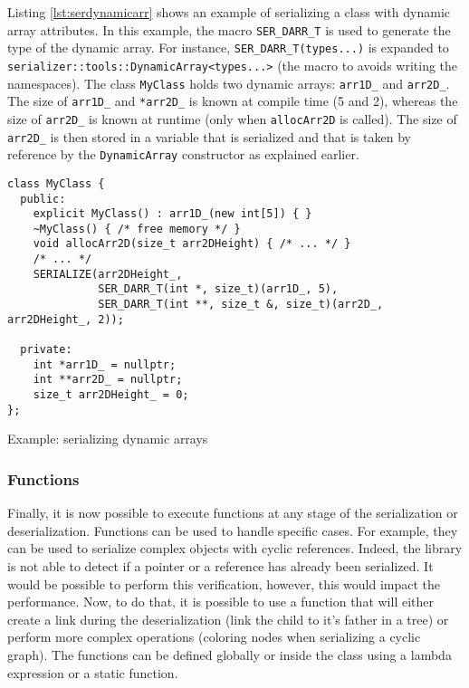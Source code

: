 Listing \ref{lst:serdynamicarr} shows an example of serializing a class with
dynamic array attributes. In this example, the macro \texttt{SER\_DARR\_T} is
used to generate the type of the dynamic array. For instance,
\texttt{SER\_DARR\_T(types...)} is expanded to
\texttt{serializer::tools::DynamicArray<types...>} (the macro to avoids writing
the namespaces). The class \texttt{MyClass} holds two dynamic arrays:
\texttt{arr1D\_} and \texttt{arr2D\_}. The size of \texttt{arr1D\_} and
\texttt{*arr2D\_} is known at compile time (5 and 2), whereas the size of
\texttt{arr2D\_} is known at runtime (only when \texttt{allocArr2D} is called).
The size of \texttt{arr2D\_} is then stored in a variable that is serialized and
that is taken by reference by the \texttt{DynamicArray} constructor as explained
earlier.

\begin{listing}[ht!]
\begin{verbatim}
class MyClass {
  public:
    explicit MyClass() : arr1D_(new int[5]) { }
    ~MyClass() { /* free memory */ }
    void allocArr2D(size_t arr2DHeight) { /* ... */ }
    /* ... */
    SERIALIZE(arr2DHeight_,
              SER_DARR_T(int *, size_t)(arr1D_, 5),
              SER_DARR_T(int **, size_t &, size_t)(arr2D_, arr2DHeight_, 2));

  private:
    int *arr1D_ = nullptr;
    int **arr2D_ = nullptr;
    size_t arr2DHeight_ = 0;
};
\end{verbatim}
\caption{Example: serializing dynamic arrays}
\label{lst:serdynamicarr}
\end{listing}

\subsubsection{Functions}

Finally, it is now possible to execute functions at any stage of the
serialization or deserialization. Functions can be used to handle specific
cases. For example, they can be used to serialize complex objects with cyclic
references. Indeed, the library is not able to detect if a pointer or a
reference has already been serialized. It would be possible to perform this
verification, however, this would impact the performance. Now, to do that, it
is possible to use a function that will either create a link during the
deserialization (link the child to it's father in a tree) or perform more
complex operations (coloring nodes when serializing a cyclic graph). The
functions can be defined globally or inside the class using a lambda expression
or a static function.

